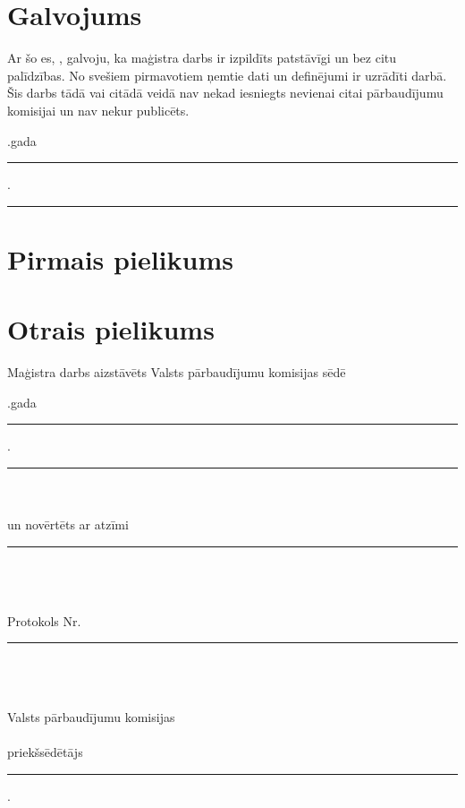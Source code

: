 \documentclass[12pt,paper=a4]{report}
\newcounter{nofappendices}
\begin{document}
\chapter*{Galvojums}
 Ar šo es, , galvoju, ka maģistra darbs ir izpildīts patstāvīgi un bez citu palīdzības. No svešiem pirmavotiem ņemtie dati un definējumi ir uzrādīti darbā. Šis darbs tādā vai citādā veidā nav nekad iesniegts nevienai citai pārbaudījumu komisijai un nav nekur publicēts.

\vspace{1in}
.gada \rule{1cm}{0.2pt}.\rule{3cm}{0.2pt}
\label{LastPage}

\appendix
\chapter{Pirmais pielikums}

\addtocounter{nofappendices}{1}
\label{appendix:tituldati}
%


\chapter{Otrais pielikums}

\addtocounter{nofappendices}{1}
\label{appendix:tituldati2}


\pagebreak
\pagestyle{empty}
\begin{center}
 Maģistra darbs aizstāvēts Valsts pārbaudījumu komisijas sēdē\\
 \vspace{1em}
\end{center}
.gada \rule{1cm}{0.2pt} . \rule{3cm}{0.2pt}\\\\
un novērtēts ar atzīmi \rule{4cm}{0.2pt} \\\\\\
Protokols Nr. \rule{1cm}{0.2pt}\\\\\\
Valsts pārbaudījumu komisijas \\\\
priekšsēdētājs \rule{7cm}{0.2pt}.\\
\hspace*{5cm}\textit{\raisebox{1em}{paraksts}}
\end{document}
